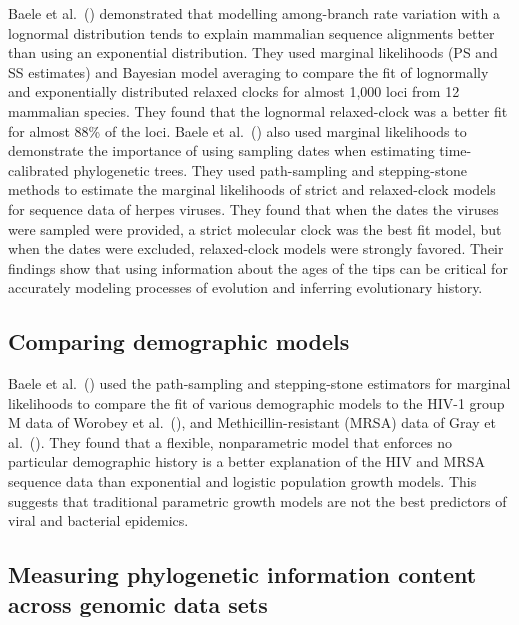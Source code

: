 Baele et al.\ (\citeyear{Baele2012}) demonstrated that modelling
among-branch rate variation with a lognormal distribution tends to explain
mammalian sequence alignments better than using an exponential distribution.
They used marginal likelihoods (PS and SS estimates) and Bayesian model
averaging to compare the fit of lognormally and exponentially distributed
relaxed clocks for almost 1,000 loci from 12 mammalian species.
They found that the lognormal relaxed-clock was a better fit for almost 88\% of
the loci.
Baele et al.\ (\citeyear{Baele2012}) also used marginal likelihoods to
demonstrate the importance of using sampling dates when estimating
time-calibrated phylogenetic trees.
They used path-sampling and stepping-stone methods to estimate the marginal
likelihoods of strict and relaxed-clock models for sequence data of herpes
viruses.
They found that when the dates the viruses were sampled were provided, a strict
molecular clock was the best fit model, but when the dates were excluded,
relaxed-clock models were strongly favored.
Their findings show that using information about the ages of the tips can be
critical for accurately modeling processes of evolution and inferring
evolutionary history.


\subsection{Comparing demographic models}

Baele et al.\ (\citeyear{Baele2012}) used the path-sampling and stepping-stone
estimators for marginal likelihoods to compare the fit of various demographic
models to the HIV-1 group M data of Worobey et al.\ (\citeyear{Worobey2008}),
and Methicillin-resistant  (MRSA)  data of Gray et
al.\ (\citeyear{Gray2011}).
They found that a flexible, nonparametric model that enforces no particular
demographic history is a better explanation of the HIV and MRSA sequence data
than exponential and logistic population growth models.
This suggests that traditional parametric growth models are not the best
predictors of viral and bacterial epidemics.



\subsection{Measuring phylogenetic information content across genomic data
    sets}


